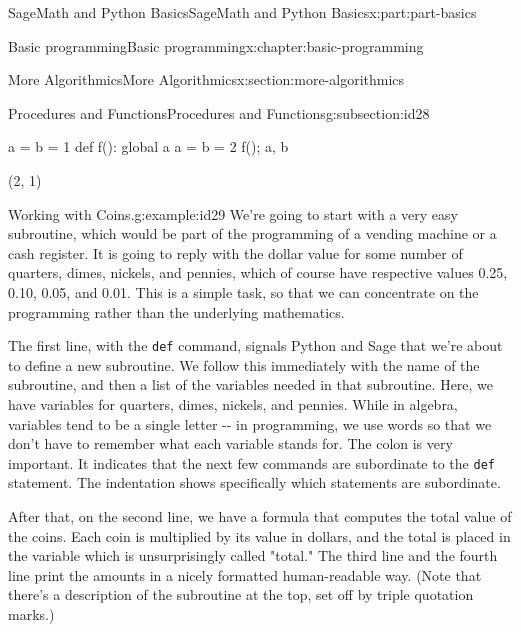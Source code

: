 \documentclass[oneside,10pt,]{book}
\newcommand{\mono}[1]{\texttt{#1}}
\numberwithin{equation}{section}
\begin{document}
\begin{partptx}{SageMath and Python Basics}{}{SageMath and Python Basics}{}{}{x:part:part-basics}
\begin{chapterptx}{Basic programming}{}{Basic programming}{}{}{x:chapter:basic-programming}
\begin{sectionptx}{More Algorithmics}{}{More Algorithmics}{}{}{x:section:more-algorithmics}
\begin{subsectionptx}{Procedures and Functions}{}{Procedures and Functions}{}{}{g:subsection:id28}
\begin{sageinput}
a = b = 1
def f():
    global a
    a = b = 2
f(); a, b
\end{sageinput}
\begin{sageoutput}
(2, 1)
\end{sageoutput}
\end{subsectionptx}
\begin{example}{Working with Coins.}{g:example:id29}%
We're going to start with a very easy subroutine, which would be part of the programming of a vending machine or a cash register.  It is going to reply with the dollar value for some number of quarters, dimes, nickels, and pennies, which of course have respective values \textdollar{}0.25, \textdollar{}0.10, \textdollar{}0.05, and \textdollar{}0.01.  This is a simple task, so that we can concentrate on the programming rather than the underlying mathematics.%
The first line, with the \mono{def} command, signals Python and Sage that we're about to define a new subroutine. We follow this immediately with the name of the subroutine, and then a list of the variables needed in that subroutine. Here, we have variables for quarters, dimes, nickels, and pennies. While in algebra, variables tend to be a single letter -{}-{} in programming, we use words so that we don't have to remember what each variable stands for. The colon is very important. It indicates that the next few commands are subordinate to the \mono{def} statement. The indentation shows specifically which statements are subordinate.%
\par
After that, on the second line, we have a formula that computes the total value of the coins. Each coin is multiplied by its value in dollars, and the total is placed in the variable which is unsurprisingly called "total." The third line and the fourth line print the amounts in a nicely formatted human-readable way. (Note that there's a description of the subroutine at the top, set off by triple quotation marks.)%

\end{example}
\end{sectionptx}
\end{chapterptx}
\end{partptx}
\end{document}
